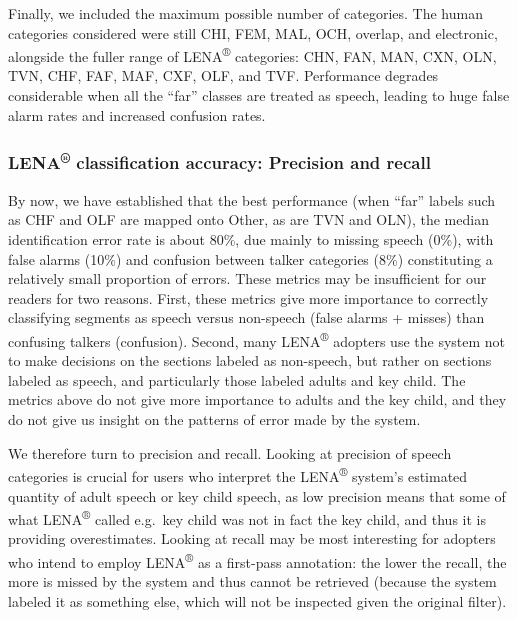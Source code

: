 \documentclass[english,table,man,floatsintext]{apa6}
\begin{document}
Finally, we included the maximum possible number of categories. The human categories considered were still CHI, FEM, MAL, OCH, overlap, and electronic, alongside the fuller range of LENA\textsuperscript{®} categories: CHN, FAN, MAN, CXN, OLN, TVN, CHF, FAF, MAF, CXF, OLF, and TVF. Performance degrades considerable when all the \enquote{far} classes are treated as speech, leading to huge false alarm rates and increased confusion rates.

\hypertarget{lena-classification-accuracy-precision-and-recall}{%
\subsubsection{\texorpdfstring{LENA\textsuperscript{®} classification accuracy: Precision and recall}{LENA® classification accuracy: Precision and recall}}\label{lena-classification-accuracy-precision-and-recall}}

By now, we have established that the best performance (when \enquote{far} labels such as CHF and OLF are mapped onto Other, as are TVN and OLN), the median identification error rate is about 80\%, due mainly to missing speech (0\%), with false alarms (10\%) and confusion between talker categories (8\%) constituting a relatively small proportion of errors. These metrics may be insufficient for our readers for two reasons. First, these metrics give more importance to correctly classifying segments as speech versus non-speech (false alarms + misses) than confusing talkers (confusion). Second, many LENA\textsuperscript{®} adopters use the system not to make decisions on the sections labeled as non-speech, but rather on sections labeled as speech, and particularly those labeled adults and key child. The metrics above do not give more importance to adults and the key child, and they do not give us insight on the patterns of error made by the system.

We therefore turn to precision and recall. Looking at precision of speech categories is crucial for users who interpret the LENA\textsuperscript{®} system's estimated quantity of adult speech or key child speech, as low precision means that some of what LENA\textsuperscript{®} called e.g.~key child was not in fact the key child, and thus it is providing overestimates. Looking at recall may be most interesting for adopters who intend to employ LENA\textsuperscript{®} as a first-pass annotation: the lower the recall, the more is missed by the system and thus cannot be retrieved (because the system labeled it as something else, which will not be inspected given the original filter).
\end{document}
